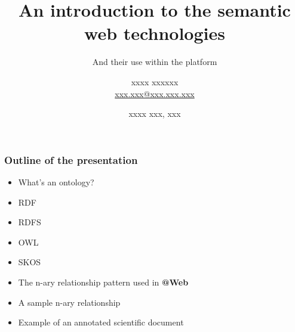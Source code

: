 \documentclass{beamer}
\title{An introduction to the semantic web technologies}
\subtitle{And their use within the \atweb platform}
\author{
  xxxx xxxxxx \\
  \footnotesize{\href{mailto:xxxxx.xxxxx@xxxxx.xxx.xxx}
                     {xxx.xxx@xxx.xxx.xxx}}
}
\date{xxxx xxx, xxx}
\institute{
  INRA SupAgro and INRIA GraphiK \\
  Montpellier, France
}
\makeatletter
\newcommand{\atweb}{\textbf{@Web}\xspace}
\makeatother
\begin{document}
\begin{frame}
  \titlepage
\end{frame}

\begin{frame}
  \frametitle{Outline of the presentation}

  \begin{itemize}
    \item What's an ontology?
    \item RDF
    \item RDFS
    \item OWL
    \item SKOS
    \item The n-ary relationship pattern used in \atweb
    \item A sample n-ary relationship
    \item Example of an annotated scientific document
  \end{itemize}
\end{frame}
\end{document}
